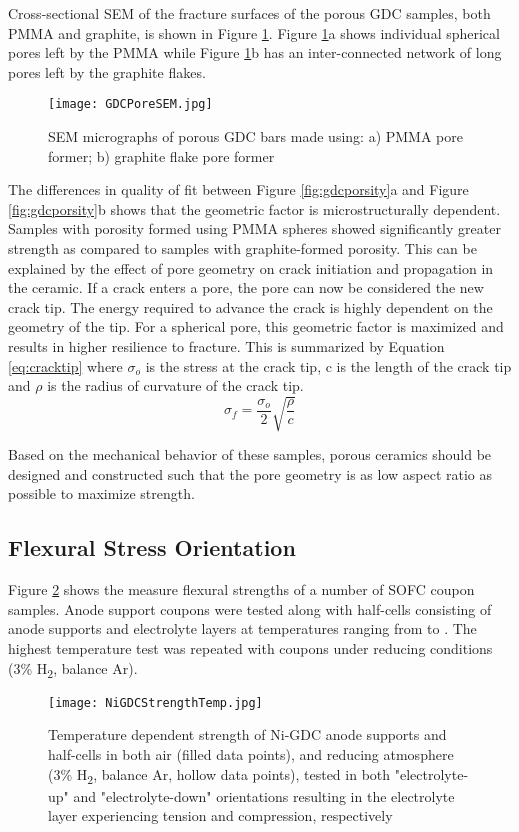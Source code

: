 Cross-sectional SEM of the fracture surfaces of the porous GDC samples,
both PMMA and graphite, is shown in Figure \ref{fig:GDCPoreSEM}.
Figure \ref{fig:GDCPoreSEM}a shows individual spherical pores left by the PMMA while Figure \ref{fig:GDCPoreSEM}b has an inter-connected network of long pores left by the graphite flakes.
\begin{figure}
    \texttt{[image: GDCPoreSEM.jpg]}
    \caption{SEM micrographs of porous GDC bars made using: a) PMMA pore former; b) graphite flake pore former}
    \label{fig:GDCPoreSEM}
\end{figure}

The differences in quality of fit between Figure \ref{fig:gdcporsity}a and Figure \ref{fig:gdcporsity}b shows that the geometric factor is microstructurally dependent.
Samples with porosity formed using PMMA spheres showed significantly greater strength as compared to samples with graphite-formed porosity.
This can be explained by the effect of pore geometry on crack initiation and propagation in the ceramic.
If a crack enters a pore, the pore can now be considered the new crack tip.
The energy required to advance the crack is highly dependent on the geometry of the tip.
For a spherical pore, this geometric factor is maximized and results in higher resilience to fracture.
This is summarized by Equation \ref{eq:cracktip} where \(\sigma_{o}\) is the stress at the crack tip, c is the length of the crack tip and \(\rho\) is the radius of curvature of the crack tip.\cite{Carter2007}
\begin{equation}
    \sigma_{f} = \frac{\sigma_{o}}{2}\sqrt{\frac{\rho}{c}}
    \label{eq:cracktip}
\end{equation}

Based on the mechanical behavior of these samples, porous ceramics should be designed and constructed such that the pore geometry is as low aspect ratio as possible to maximize strength.

\subsection{Flexural Stress Orientation}

Figure \ref{fig:NiGDCHalfCells} shows the measure flexural strengths of a number of SOFC coupon samples.
Anode support coupons were tested along with half-cells consisting of anode supports and electrolyte layers at temperatures ranging from  to .
The highest temperature test was repeated with coupons under reducing conditions (3\% H\textsubscript{2}, balance Ar).
\begin{figure}
    \texttt{[image: NiGDCStrengthTemp.jpg]}
    \caption{Temperature dependent strength of Ni-GDC anode supports and half-cells in both air (filled data points), and reducing atmosphere (3\% H\textsubscript{2}, balance Ar, hollow data points), tested in both "electrolyte-up" and "electrolyte-down" orientations resulting in the electrolyte layer experiencing tension and compression, respectively}
    \label{fig:NiGDCHalfCells}
\end{figure}

